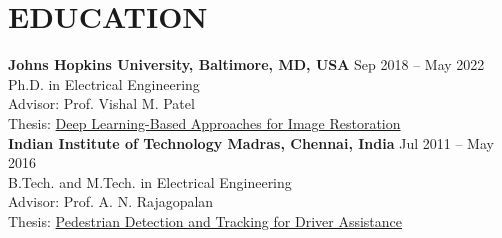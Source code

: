 \documentclass[margin,11pt]{resume}
\begin{document}
\section{\footnotesize {\large E}DUCATION}
{\bf Johns Hopkins University, Baltimore, MD, USA} \hfill Sep 2018 -- May 2022\vspace{.4mm}\\
Ph.D. in Electrical Engineering\\
Advisor: Prof. Vishal M. Patel\\
Thesis: \href{https://jscholarship.library.jhu.edu/items/8f0ebb3d-4142-4c67-a191-35776fe15014}{Deep Learning-Based Approaches for Image Restoration}\\
{\bf Indian Institute of Technology Madras, Chennai, India} \hfill Jul 2011 -- May 2016\vspace{.4mm}\\
B.Tech. and M.Tech. in Electrical Engineering\\
Advisor: Prof. A. N. Rajagopalan\\
Thesis: \href{https://eescholars.iitm.ac.in/sites/default/files/eethesis/ee11b080.pdf}{Pedestrian Detection and Tracking for Driver Assistance}

\vspace{-1.em}
\end{document}
